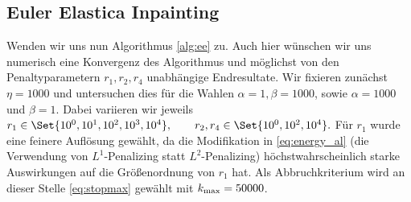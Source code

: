 \documentclass{mythesis}
\begin{document}


\subsection*{Euler Elastica Inpainting}

Wenden wir uns nun Algorithmus \ref{alg:ee} zu.
Auch hier wünschen wir uns numerisch eine Konvergenz des Algorithmus und möglichst von den Penaltyparametern $r_1, r_2, r_4$ unabhängige Endresultate.
Wir fixieren zunächst $\eta = 1000$ und untersuchen dies für die Wahlen $\alpha = 1, \beta = 1000$, sowie $\alpha = 1000$ und $\beta = 1$.
Dabei variieren wir jeweils
\begin{math}[numbered] \label{eq:num_param}
    r_1 \in \Set{10^0, 10^1, 10^2, 10^3, 10^4}, \qquad
    r_2, r_4 \in \Set{10^0, 10^2, 10^4}.
\end{math}
Für $r_1$ wurde eine feinere Auflösung gewählt, da die Modifikation in \eqref{eq:energy_al} (die Verwendung von $L^1$-Penalizing statt $L^2$-Penalizing) höchstwahrscheinlich starke Auswirkungen auf die Größenordnung von $r_1$ hat.
Als Abbruchkriterium wird an dieser Stelle \eqref{eq:stopmax} gewählt mit $k_{\mathrm{max}} = 50000$.
\end{document}

